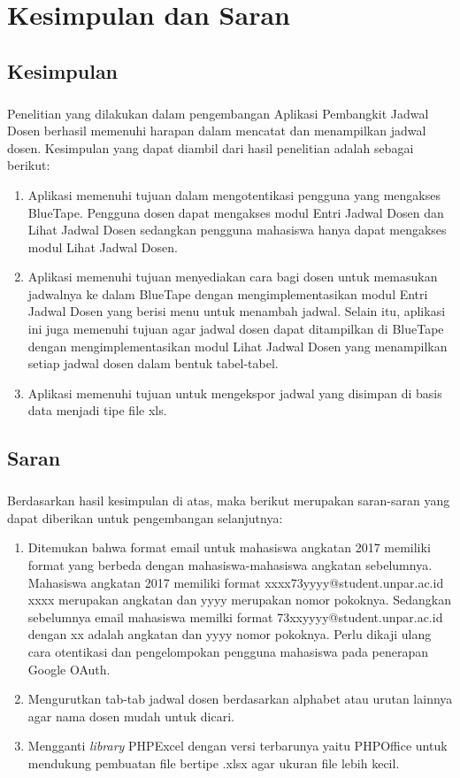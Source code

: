 \chapter{Kesimpulan dan Saran}
\section{Kesimpulan}
\paragraph{} Penelitian yang dilakukan dalam pengembangan Aplikasi Pembangkit Jadwal Dosen berhasil memenuhi harapan dalam mencatat dan menampilkan jadwal dosen. Kesimpulan yang dapat diambil dari hasil penelitian adalah sebagai berikut:
\begin{enumerate}
	\item Aplikasi memenuhi tujuan dalam mengotentikasi pengguna yang mengakses BlueTape. Pengguna dosen dapat mengakses modul Entri Jadwal Dosen dan Lihat Jadwal Dosen sedangkan pengguna mahasiswa hanya dapat mengakses modul Lihat Jadwal Dosen.
	\item Aplikasi memenuhi tujuan menyediakan cara bagi dosen untuk memasukan jadwalnya ke dalam BlueTape dengan mengimplementasikan modul Entri Jadwal Dosen yang berisi menu untuk menambah jadwal. Selain itu, aplikasi ini juga memenuhi tujuan agar jadwal dosen dapat ditampilkan di BlueTape dengan mengimplementasikan modul Lihat Jadwal Dosen yang menampilkan setiap jadwal dosen dalam bentuk tabel-tabel.
	\item Aplikasi memenuhi tujuan untuk mengekspor jadwal yang disimpan di basis data menjadi tipe file xls.
\end{enumerate}

\section{Saran}
\paragraph{}Berdasarkan hasil kesimpulan di atas, maka berikut merupakan saran-saran yang dapat diberikan untuk pengembangan selanjutnya:
\begin{enumerate}
	\item Ditemukan bahwa format email untuk mahasiswa angkatan 2017 memiliki format yang berbeda dengan mahasiswa-mahasiswa angkatan sebelumnya. Mahasiswa angkatan 2017 memiliki format xxxx73yyyy@student.unpar.ac.id xxxx merupakan angkatan dan yyyy merupakan nomor pokoknya. Sedangkan sebelumnya email mahasiswa memilki format 73xxyyyy@student.unpar.ac.id dengan xx adalah angkatan dan yyyy nomor pokoknya. Perlu dikaji ulang cara otentikasi dan pengelompokan pengguna mahasiswa pada penerapan Google OAuth.
	\item Mengurutkan tab-tab jadwal dosen berdasarkan alphabet atau urutan lainnya agar nama dosen mudah untuk dicari.
	\item Mengganti \textit{library} PHPExcel dengan versi terbarunya yaitu PHPOffice untuk mendukung pembuatan file bertipe .xlsx agar ukuran file lebih kecil.
\end{enumerate}
